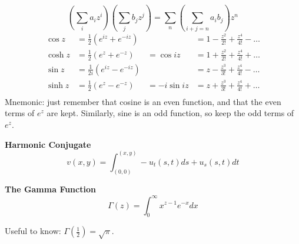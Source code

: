 \documentclass{article}
\begin{document}
\[
\left(\sum_i a_i z^i \right) \left( \sum_j b_j z^j\right) = \sum_n \left( \sum\limits_{i+j=n}a_ib_j \right) z^n
\]
\begin{align*}
%   
\cos z 
&= \frac{1}{2}(e^{iz} + e^{-iz})
&
&= 1 - \frac{z^2}{2!} + \frac{z^4}{4!} - \ldots \\
%
\cosh z 
&= \frac{1}{2}(e^{z} + e^{-z}) 
&= \cos iz 
&= 1 + \frac{z^2}{2!} + \frac{z^4}{4!} + \ldots \\
%
\sin z 
&= \frac{1}{2i}(e^{iz} - e^{-iz}) 
&
&= z - \frac{z^3}{3!} + \frac{z^4}{4!} - \ldots \\
%
\sinh z 
&= \frac{1}{2}(e^{z} - e^{-z}) 
&= -i\sin iz 
&= z + \frac{z^3}{3!} + \frac{z^4}{4!} + \ldots \\
\end{align*}
Mnemonic: just remember that cosine is an even function, and that the even terms of $e^z$ are kept. Similarly, sine is an odd function, so keep the odd terms of $e^z$.

\textbf{Harmonic Conjugate}
\[ v(x,y) = \int_{(0,0)}^{(x,y)} -u_t(s,t)ds + u_s(s,t)dt\]

\textbf{The Gamma Function}
\[ \Gamma(z) = \int_0^\infty x^{z-1} e^{-x} dx \]

Useful to know: $\Gamma(\frac{1}{2}) = \sqrt\pi$.


\end{document}
